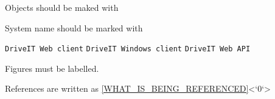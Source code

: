 
Objects should be maked with \texttt{}

System name should be marked with \texttt{}

\texttt{DriveIT Web client}
\texttt{DriveIT Windows client}
\texttt{DriveIT Web API}

Figures must be labelled.

References are written as \ref{WHAT_IS_BEING_REFERENCED}<`0`>
